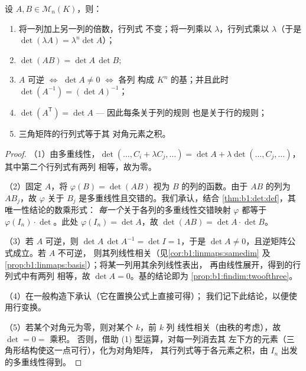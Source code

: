 \begin{theorem}[性质]\label{thm:b1:det:props}
设 $A, B \in \mathcal{M}_n(K)$，则：
\begin{enumerate}
  \item 将一列加上另一列的倍数，行列式
        不变；将一列乘以 $\lambda$，行列式乘以
        $\lambda$（于是 $\det(\lambda A) = \lambda^n \det A$）；
  \item $\det(AB) = \det A\, \det B$;
  \item $A$ 可逆 $\iff$ $\det A \neq 0$ $\iff$ 各列
        构成 $K^n$ 的基；并且此时 $\det(A^{-1}) = (\det
        A)^{-1}$；
  \item $\det(A^{\mathsf T}) = \det A$ --- 因此每条关于列的规则
        也是关于行的规则；
  \item 三角矩阵的行列式等于其
        对角元素之积。
\end{enumerate}
\end{theorem}

\begin{proof}
（1）由多重线性，$\det(\dots, C_i + \lambda C_j, \dots) = \det A +
\lambda\det(\dots, C_j, \dots)$，其中第二个行列式有两列
相等，故为零。

（2）固定 $A$，将 $\varphi(B) = \det(AB)$ 视为
$B$ 的列的函数。由于 $AB$ 的列为 $AB_j$，故 $\varphi$
关于 $B_j$ 是多重线性且交错的。我们承认，结合
\cref{thm:b1:det:def}，其唯一性结论的数乘形式：
\emph{每一个}关于各列的多重线性交错映射 $\varphi$
都等于 $\varphi(I_n) \cdot \det$。此处 $\varphi(I_n) = \det A$，故
$\det(AB) = \det A \cdot \det B$。

（3）若 $A$ 可逆，则 $\det A\,\det A^{-1} = \det I = 1$，于是
$\det A \neq 0$，且逆矩阵公式成立。若 $A$ 不可逆，
则其列线性相关（见\cref{cor:b1:linmaps:samedim}
及\cref{prop:b1:linmaps:basis}）；将某一列用其余列线性表出，
再由线性展开，得到的行列式中有两列
相等，故 $\det A = 0$。基的结论即为
\cref{prop:b1:findim:twoofthree}。

（4）在一般构造下承认（它在置换公式上直接可得）；
我们记下此结论，以便使用行变换。

（5）若某个对角元为零，则对某个 $k$，前 $k$ 列
线性相关（由秩的考虑），故 $\det = 0 =$ 乘积。
否则，借助 (1) 型运算，对每一列消去其
左下方的元素（三角形结构使这一点可行），化为对角矩阵，
其行列式等于各元素之积，由
$I_n$ 出发的多重线性得到。
\end{proof}

